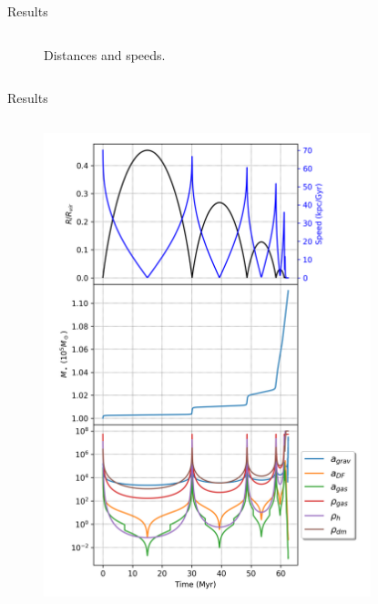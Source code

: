 \documentclass{beamer}
\begin{document}
\begin{frame}{Results}
\begin{columns}
\begin{column}{0.7\linewidth}
\begin{figure}[h]
				\caption{Distances and speeds.}
			\end{figure}
		\end{column}
	\end{columns}
\end{frame}

\begin{frame}{Results}
	\begin{columns}
		\begin{column}{0.3\linewidth}
			\begin{figure}[h]
				\centering
				\includegraphics[height=0.7\textheight]{"../Files/Week 6/properties_s02v70"}
			\end{figure}
		\end{column}
		\begin{column}{0.7\linewidth}
			\begin{figure}[h]
				\centering

\end{figure}
\end{column}
\end{columns}
\end{frame}
\end{document}
